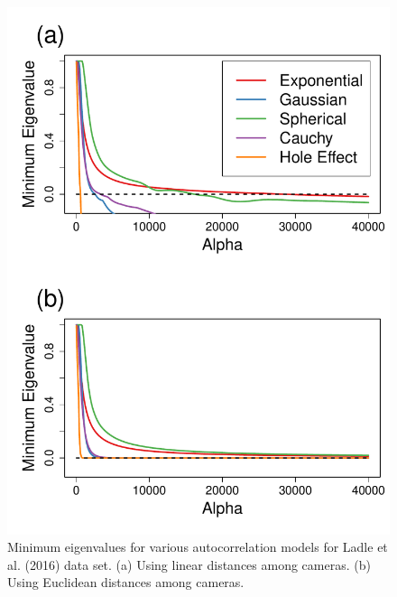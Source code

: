 \documentclass[11pt, titlepage]{article}\usepackage[]{graphicx}\usepackage[]{color}
\begin{document}
\begin{spacing}{1.9}
\begin{flushleft}
\begin{singlespace}
	\begin{figure}[H]
	  \begin{center}
	    \includegraphics[width=.7\linewidth]{figure/realLinDistEigVals-1.pdf}
	  \end{center}
	  \caption{Minimum eigenvalues for various autocorrelation models for Ladle et al. (2016) data set. (a) Using linear distances among cameras. (b) Using Euclidean distances among cameras.  \label{fig:realLinDistEigVals}}
  \end{figure}




\end{singlespace}
\end{flushleft}
\end{spacing}
\end{document}

